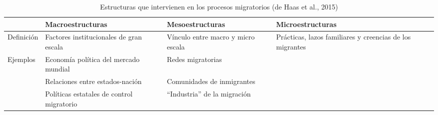 \begin{longtable}{p{2cm}p{4cm}p{4cm}p{4cm}}
\caption{Estructuras que intervienen en los procesos migratorios (de Haas et al., 2015)}\\
\toprule
& Macroestructuras & Mesoestructuras & Microestructuras \\
\midrule
\endhead
Definición & Factores institucionales de gran escala & Vínculo entre
macro y micro escala & Prácticas, lazos familiares y creencias de los
migrantes \\
 Ejemplos & Economía política del mercado mundial & Redes migratorias
& \\
& Relaciones entre estados-nación & Comunidades de inmigrantes & \\
& Políticas estatales de control migratorio & ``Industria'' de la
migración & \\
\bottomrule
\end{longtable}
